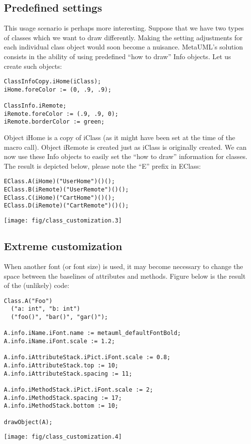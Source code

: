 \documentclass{article}
\newcommand{\code}{\ttfamily}
\begin{document}
\subsection{Predefined settings}

This usage scenario is perhaps more interesting. Suppose that we have two
types of classes which we want to draw differently. Making the setting adjustments
for each individual class object would soon become a nuisance. MetaUML's solution consists in the
ability of using predefined ``how to draw'' {\code Info} objects. Let us create such objects:

\begin{verbatim}
ClassInfoCopy.iHome(iClass);
iHome.foreColor := (0, .9, .9);

ClassInfo.iRemote;
iRemote.foreColor := (.9, .9, 0);
iRemote.borderColor := green;
\end{verbatim}

Object {\code iHome} is a copy of {\code iClass} (as it might have been set at
the time of the macro call). Object {\code iRemote} is created just as {\code iClass}
is originally created. We can now use these {\code Info} objects to easily set the
``how to draw'' information for classes. The result is depicted below,
please note the ``{\code E}'' prefix in {\code EClass}:

\begin{multicols}{2}
\begin{verbatim}
EClass.A(iHome)("UserHome")()();
EClass.B(iRemote)("UserRemote")()();
EClass.C(iHome)("CartHome")()();
EClass.D(iRemote)("CartRemote")()();
\end{verbatim}
\columnbreak
\hspace{1cm}\texttt{[image: fig/class\_customization.3]}
\end{multicols}

\subsection{Extreme customization}

When another font (or font size) is used, it may become necessary to change the space between the
baselines of attributes and methods. Figure below is the result of the (unlikely) code:

\begin{multicols}{2}
\begin{verbatim}
Class.A("Foo")
  ("a: int", "b: int")
  ("foo()", "bar()", "gar()");

A.info.iName.iFont.name := metauml_defaultFontBold;
A.info.iName.iFont.scale := 1.2;

A.info.iAttributeStack.iPict.iFont.scale := 0.8;
A.info.iAttributeStack.top := 10;
A.info.iAttributeStack.spacing := 11;

A.info.iMethodStack.iPict.iFont.scale := 2;
A.info.iMethodStack.spacing := 17;
A.info.iMethodStack.bottom := 10;

drawObject(A);
\end{verbatim}
\columnbreak
\hspace{4cm}\texttt{[image: fig/class\_customization.4]}
\end{multicols}
\end{document}
